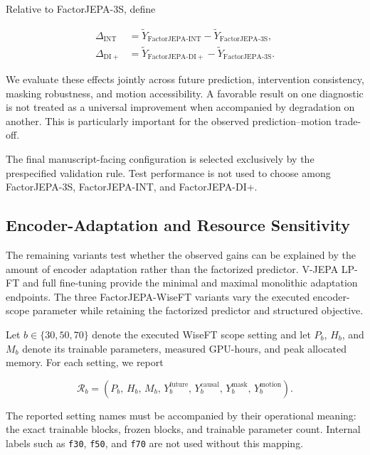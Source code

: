 Relative to FactorJEPA-3S, define

\begin{equation*}
\begin{aligned}
\Delta_{\mathrm{INT}}
&=
\widetilde Y_{\mathrm{FactorJEPA\text{-}INT}}
-
\widetilde Y_{\mathrm{FactorJEPA\text{-}3S}},
\\
\Delta_{\mathrm{DI+}}
&=
\widetilde Y_{\mathrm{FactorJEPA\text{-}DI+}}
-
\widetilde Y_{\mathrm{FactorJEPA\text{-}3S}}.
\end{aligned}
\end{equation*}

We evaluate these effects jointly across future prediction,
intervention consistency, masking robustness, and motion accessibility.
A favorable result on one diagnostic is not treated as a universal
improvement when accompanied by degradation on another. This is
particularly important for the observed prediction--motion trade-off.

The final manuscript-facing configuration is selected exclusively by
the prespecified validation rule. Test performance is not used to
choose among FactorJEPA-3S, FactorJEPA-INT, and FactorJEPA-DI+.


\subsection{Encoder-Adaptation and Resource Sensitivity}
\label{app:attribution_encoder_scope}

The remaining variants test whether the observed gains can be
explained by the amount of encoder adaptation rather than the
factorized predictor. V-JEPA LP-FT and full fine-tuning provide the
minimal and maximal monolithic adaptation endpoints. The three
FactorJEPA-WiseFT variants vary the executed encoder-scope parameter
while retaining the factorized predictor and structured objective.

Let \(b\in\{30,50,70\}\) denote the executed WiseFT scope setting and
let \(P_b\), \(H_b\), and \(M_b\) denote its trainable parameters,
measured GPU-hours, and peak allocated memory. For each setting, we
report

\begin{equation*}
\mathcal R_b
=
\left(
P_b,\,
H_b,\,
M_b,\,
Y_b^{\mathrm{future}},\,
Y_b^{\mathrm{causal}},\,
Y_b^{\mathrm{mask}},\,
Y_b^{\mathrm{motion}}
\right).
\end{equation*}

The reported setting names must be accompanied by their operational
meaning: the exact trainable blocks, frozen blocks, and trainable
parameter count. Internal labels such as \texttt{f30},
\texttt{f50}, and \texttt{f70} are not used without this mapping.

